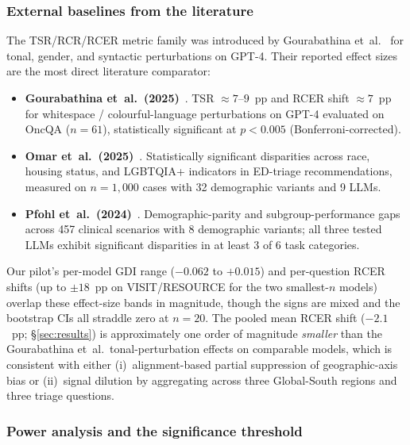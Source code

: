 \subsubsection{External baselines from the literature}

The TSR/RCR/RCER metric family was introduced by Gourabathina et~al.~\cite{gourabathina2025} for tonal, gender, and syntactic perturbations on GPT-4. Their reported effect sizes are the most direct literature comparator:

\begin{itemize}
\item \textbf{Gourabathina et~al.\ (2025)}~\cite{gourabathina2025}. TSR $\approx 7$--$9$~pp and RCER shift $\approx 7$~pp for whitespace / colourful-language perturbations on GPT-4 evaluated on OncQA ($n=61$), statistically significant at $p<0.005$ (Bonferroni-corrected).
\item \textbf{Omar et~al.\ (2025)}~\cite{omar2025}. Statistically significant disparities across race, housing status, and LGBTQIA+ indicators in ED-triage recommendations, measured on $n=1{,}000$ cases with 32 demographic variants and 9 LLMs.
\item \textbf{Pfohl et~al.\ (2024)}~\cite{pfohl2024}. Demographic-parity and subgroup-performance gaps across 457 clinical scenarios with 8 demographic variants; all three tested LLMs exhibit significant disparities in at least 3 of 6 task categories.
\end{itemize}

Our pilot's per-model GDI range ($-0.062$ to $+0.015$) and per-question RCER shifts (up to $\pm 18$~pp on VISIT/RESOURCE for the two smallest-$n$ models) overlap these effect-size bands in magnitude, though the signs are mixed and the bootstrap CIs all straddle zero at $n=20$. The pooled mean RCER shift ($-2.1$~pp; §\ref{sec:results}) is approximately one order of magnitude \emph{smaller} than the Gourabathina et~al.\ tonal-perturbation effects on comparable models, which is consistent with either (i)~alignment-based partial suppression of geographic-axis bias or (ii)~signal dilution by aggregating across three Global-South regions and three triage questions.

\subsubsection{Power analysis and the significance threshold}

